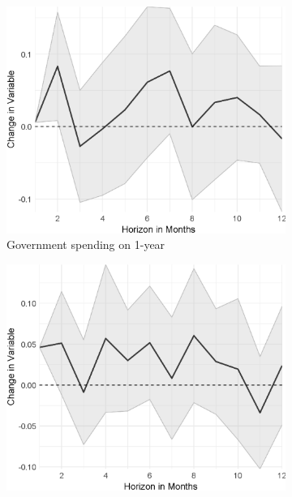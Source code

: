 
\begin{figure}[H]
	\centering
	\captionsetup{font=footnotesize}
	\begin{subfigure}{00.32\textwidth}
	\includegraphics[width=1\textwidth]{output/lp/baseline/diff/government_spending/government_spendingonexpectations1y_djn.eps}
	\caption{Government spending on 1-year}
\end{subfigure}
\begin{subfigure}{00.32\textwidth}
	\includegraphics[width=1\textwidth]{output/lp/baseline/diff/monetary_policy/monetary_policyonexpectations1y_djn.eps}

\end{subfigure}
\end{figure}

